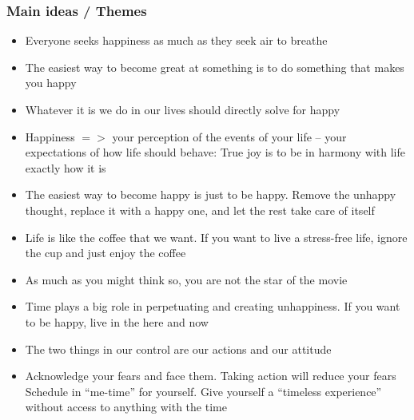 \begin{frame}[fragile]\frametitle{Main ideas / Themes}

\begin{itemize}
\item Everyone seeks happiness as much as they seek air to breathe
\item The easiest way to become great at something is to do something that makes you happy
\item Whatever it is we do in our lives should directly solve for happy
\item Happiness $=>$ your perception of the events of your life – your expectations of how life should behave: True joy is to be in harmony with life exactly how it is
\item The easiest way to become happy is just to be happy. Remove the unhappy thought, replace it with a happy one, and let the rest take care of itself 
\item Life is like the coffee that we want. If you want to live a stress-free life, ignore the cup and just enjoy the coffee
\item As much as you might think so, you are not the star of the movie
\item Time plays a big role in perpetuating and creating unhappiness. If you want to be happy, live in the here and now
\item The two things in our control are our actions and our attitude
\item Acknowledge your fears and face them. Taking action will reduce your fears
Schedule in “me-time” for yourself. Give yourself a “timeless experience” without access to anything with the time
\end{itemize}

\end{frame}

